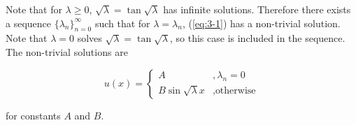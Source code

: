 \documentclass{article}
\begin{document}
\hfill \break
Note that for $\lambda \geq 0$, $\sqrt{\lambda} = \tan\sqrt{\lambda}$ has infinite solutions. Therefore
there exists a sequence $\{\lambda_n\}_{n = 0}^\infty$ such that for $\lambda = \lambda_n$, (\ref{eq:3-1})
has a non-trivial solution. Note that $\lambda = 0$ solves $\sqrt{\lambda} = \tan\sqrt{\lambda}$, so this
case is included in the sequence. The non-trivial solutions are

\begin{equation*}
    u(x) = \begin{cases}
        A &, \lambda_n = 0\\
        B\sin\sqrt{\lambda}x &, \text{otherwise}
    \end{cases}
\end{equation*}

for constants $A$ and $B$.
\end{document}
